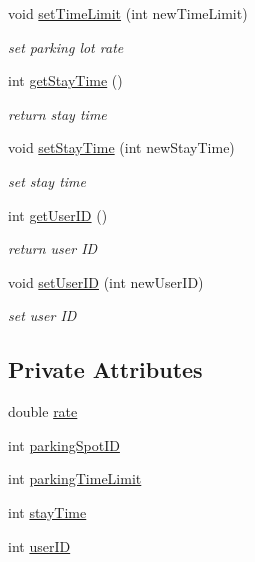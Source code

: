 \begin{DoxyCompactItemize}
void \mbox{\hyperlink{class_parking_session_a7d3709e88ba42f4d3b0407f675a6bb78}{set\+Time\+Limit}} (int new\+Time\+Limit)
\begin{DoxyCompactList}\small\item\em set parking lot rate \end{DoxyCompactList}\item 
int \mbox{\hyperlink{class_parking_session_a87514c461ced20ad263e808ad231eb1a}{get\+Stay\+Time}} ()
\begin{DoxyCompactList}\small\item\em return stay time \end{DoxyCompactList}\item 
void \mbox{\hyperlink{class_parking_session_a4b87ced554faf05185a8399b59e1db72}{set\+Stay\+Time}} (int new\+Stay\+Time)
\begin{DoxyCompactList}\small\item\em set stay time \end{DoxyCompactList}\item 
int \mbox{\hyperlink{class_parking_session_a1a49f4f70f7aceaba627f6e9c7a1e6c7}{get\+User\+ID}} ()
\begin{DoxyCompactList}\small\item\em return user ID \end{DoxyCompactList}\item 
void \mbox{\hyperlink{class_parking_session_ac68d6b980db1def77be515abde9f3e27}{set\+User\+ID}} (int new\+User\+ID)
\begin{DoxyCompactList}\small\item\em set user ID \end{DoxyCompactList}\end{DoxyCompactItemize}
\subsection*{Private Attributes}
\begin{DoxyCompactItemize}
\item 
double \mbox{\hyperlink{class_parking_session_a952fec66c7e52935ddfd8886e1b9a665}{rate}}
\item 
int \mbox{\hyperlink{class_parking_session_a63055bbfd23ccc76ff15e966dc0d8fd9}{parking\+Spot\+ID}}
\item 
int \mbox{\hyperlink{class_parking_session_a62ae8434d54ee156c48c5c2169d8428d}{parking\+Time\+Limit}}
\item 
int \mbox{\hyperlink{class_parking_session_ab631e1ee30c31122bbb442f92d28b91c}{stay\+Time}}
\item 
int \mbox{\hyperlink{class_parking_session_a97f035ac623d3b67d91bc9c5cbdf57bb}{user\+ID}}
\end{DoxyCompactItemize}


